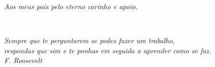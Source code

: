 \documentclass[12pt,fleqn]{book} %
\begin{document}
\newpage
\thispagestyle{empty}
\null\vfill

\begin{comment}
\begin{center}
	\begin{tabular}{|p{12.5cm}|}%
		\hline
		\begin{small}
			\begin{verbatim}
			#D249i	Drumond, David
			#Geoestatística - Introdução aos princípios / 
			David A. Drumond. - Belo Horizonte : O Autor, 2017. 
			117 p. 
			
			ISBN: 978-85-923922-0-8
			
			
			1. Engenharia de Minas . 2. Geologia. 3. Geoestatística.
			I. Título.
		
			CDD: 550
			\end{verbatim}
		\end{small}
		\\ \hline
	\end{tabular}
\end{center}
\end{comment}

\setcounter{page}{2} %

\newpage
\thispagestyle{empty}
\vspace*{\fill}

{ \raggedleft
	
	
	\textit{Aos meus pais pelo eterno carinho e apoio.}
	
	~
}


\newpage
\thispagestyle{empty}
\vspace*{\fill}

{ \raggedleft
	
	
	\textit{Sempre que te perguntarem se podes fazer um trabalho, \\
		respondas que sim e te ponhas em seguida a aprender como se faz. \\
		F. Roosevelt}
	
	~
}



\newpage







\end{document}
